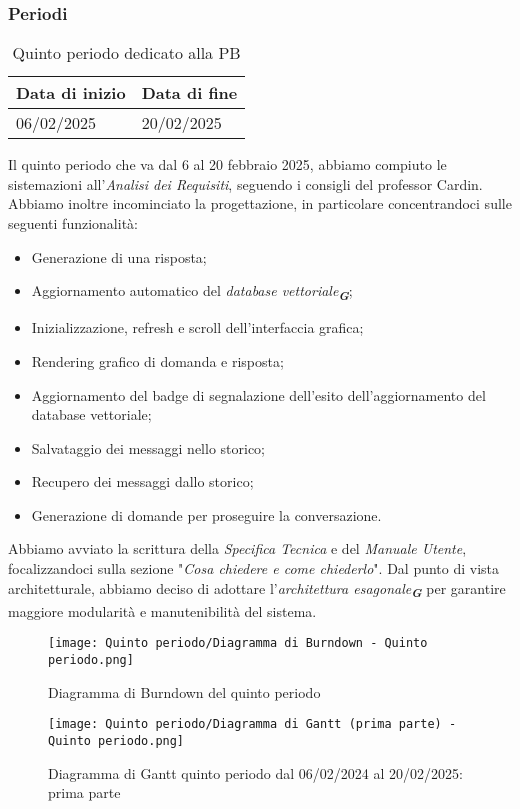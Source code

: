 \subsubsection{Periodi}
\label{sec:periodi_PB}

\label{sec:quinto periodo}
\begin{table}[h!]
    \centering
    \renewcommand{\arraystretch}{1.5} %
    \begin{tabularx}{\textwidth}{|X|X|}\hline
    \rowcolor[HTML]{FFD700} 
    \textbf{Data di inizio} & \textbf{Data di fine} \\ \hline
    06/02/2025 & 20/02/2025 \\ \hline
    \end{tabularx}
    \caption{Quinto periodo dedicato alla PB}
\end{table}
Il quinto periodo che va dal 6 al 20 febbraio 2025, abbiamo compiuto le sistemazioni all'\emph{Analisi dei Requisiti}, seguendo i
consigli del professor Cardin. Abbiamo inoltre incominciato la progettazione, in particolare concentrandoci sulle seguenti funzionalità:
\begin{itemize}
\item Generazione di una risposta;
\item Aggiornamento automatico del {\emph{database vettoriale}}\textsubscript{\textit{\textbf{G}}};
\item Inizializzazione, refresh e scroll dell'interfaccia grafica;
\item Rendering grafico di domanda e risposta;
\item Aggiornamento del badge di segnalazione dell'esito dell'aggiornamento del database vettoriale;
\item Salvataggio dei messaggi nello storico;
\item Recupero dei messaggi dallo storico;
\item Generazione di domande per proseguire la conversazione.
\end{itemize}
Abbiamo avviato la scrittura della \emph{Specifica Tecnica} e del \emph{Manuale Utente}, focalizzandoci sulla sezione
"\emph{Cosa chiedere e come chiederlo}".
Dal punto di vista architetturale, abbiamo deciso di adottare l’{\emph{architettura esagonale}}\textsubscript{\textit{\textbf{G}}}
per garantire maggiore modularità e manutenibilità del sistema.

\newpage
\begin{figure}[h] 
    \centering
    \texttt{[image: Quinto periodo/Diagramma di Burndown - Quinto periodo.png]}
    \caption{Diagramma di Burndown del quinto periodo} 
    \label{fig: Diagramma di Burndown del quinto periodo}
\end{figure}
\newpage
\begin{figure}[h] 
    \centering
    \texttt{[image: Quinto periodo/Diagramma di Gantt (prima parte) - Quinto periodo.png]}
    \caption{Diagramma di Gantt quinto periodo dal 06/02/2024 al 20/02/2025: prima parte} 
    \label{fig: Diagramma di Gantt quinto periodo dal 06/02/2024 al 20/02/2025: prima parte}
\end{figure}
\newpage


